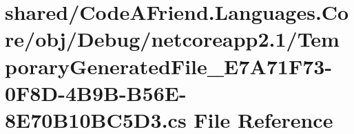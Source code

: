 \hypertarget{shared_2_code_a_friend_8_languages_8_core_2obj_2_debug_2netcoreapp2_81_2_temporary_generated_fil30a1479e452f544a12e2b7e7d54ed17e}{}\section{shared/\+Code\+A\+Friend.Languages.\+Core/obj/\+Debug/netcoreapp2.1/\+Temporary\+Generated\+File\+\_\+\+E7\+A71\+F73-\/0\+F8\+D-\/4\+B9\+B-\/\+B56\+E-\/8\+E70\+B10\+B\+C5\+D3.cs File Reference}
\label{shared_2_code_a_friend_8_languages_8_core_2obj_2_debug_2netcoreapp2_81_2_temporary_generated_fil30a1479e452f544a12e2b7e7d54ed17e}
